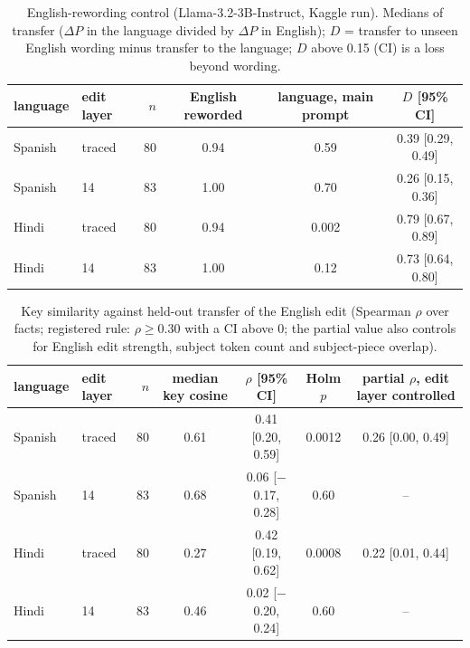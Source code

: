 \documentclass[11pt]{article}
\begin{document}
\begin{table}[t]\centering\small\begin{tabular}{llrccc}\toprule
language & edit layer & $n$ & English reworded & language, main prompt & $D$ [95\% CI] \\\midrule
Spanish & traced & 80 & 0.94 & 0.59 & 0.39 [0.29, 0.49] \\
Spanish & 14 & 83 & 1.00 & 0.70 & 0.26 [0.15, 0.36] \\
Hindi & traced & 80 & 0.94 & 0.002 & 0.79 [0.67, 0.89] \\
Hindi & 14 & 83 & 1.00 & 0.12 & 0.73 [0.64, 0.80] \\
\bottomrule\end{tabular}\caption{English-rewording control (Llama-3.2-3B-Instruct, Kaggle run). Medians of transfer ($\Delta P$ in the language divided by $\Delta P$ in English); $D$ = transfer to unseen English wording minus transfer to the language; $D$ above 0.15 (CI) is a loss beyond wording.}\label{tab:wording}\end{table}
\begin{table}[t]\centering\small\begin{tabular}{llrcccc}\toprule
language & edit layer & $n$ & median key cosine & $\rho$ [95\% CI] & Holm $p$ & partial $\rho$, edit layer controlled \\\midrule
Spanish & traced & 80 & 0.61 & 0.41 [0.20, 0.59] & 0.0012 & 0.26 [0.00, 0.49] \\
Spanish & 14 & 83 & 0.68 & 0.06 [$-$0.17, 0.28] & 0.60 & -- \\
Hindi & traced & 80 & 0.27 & 0.42 [0.19, 0.62] & 0.0008 & 0.22 [0.01, 0.44] \\
Hindi & 14 & 83 & 0.46 & 0.02 [$-$0.20, 0.24] & 0.60 & -- \\
\bottomrule\end{tabular}\caption{Key similarity against held-out transfer of the English edit (Spearman $\rho$ over facts; registered rule: $\rho \geq 0.30$ with a CI above 0; the partial value also controls for English edit strength, subject token count and subject-piece overlap).}\label{tab:key}\end{table}
\end{document}
